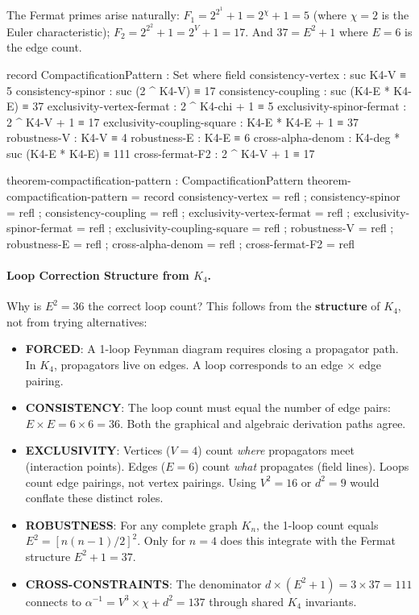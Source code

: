 \documentclass[11pt,a4paper]{book}
\begin{document}
The Fermat primes arise naturally: $F_1 = 2^{2^1} + 1 = 2^\chi + 1 = 5$ (where $\chi = 2$ is the Euler characteristic); $F_2 = 2^{2^2} + 1 = 2^V + 1 = 17$. And $37 = E^2 + 1$ where $E = 6$ is the edge count.

\begin{code}
record CompactificationPattern : Set where
  field
    consistency-vertex : suc K4-V ≡ 5
    consistency-spinor : suc (2 ^ K4-V) ≡ 17
    consistency-coupling : suc (K4-E * K4-E) ≡ 37
    exclusivity-vertex-fermat : 2 ^ K4-chi + 1 ≡ 5
    exclusivity-spinor-fermat : 2 ^ K4-V + 1 ≡ 17
    exclusivity-coupling-square : K4-E * K4-E + 1 ≡ 37
    robustness-V : K4-V ≡ 4
    robustness-E : K4-E ≡ 6
    cross-alpha-denom : K4-deg * suc (K4-E * K4-E) ≡ 111
    cross-fermat-F2 : 2 ^ K4-V + 1 ≡ 17

theorem-compactification-pattern : CompactificationPattern
theorem-compactification-pattern = record
  { consistency-vertex = refl
  ; consistency-spinor = refl
  ; consistency-coupling = refl
  ; exclusivity-vertex-fermat = refl
  ; exclusivity-spinor-fermat = refl
  ; exclusivity-coupling-square = refl
  ; robustness-V = refl
  ; robustness-E = refl
  ; cross-alpha-denom = refl
  ; cross-fermat-F2 = refl
  }

\end{code}

\paragraph{Loop Correction Structure from $K_4$.}
Why is $E^2 = 36$ the correct loop count? This follows from the \textbf{structure}
of $K_4$, not from trying alternatives:

\begin{itemize}
\item \textbf{FORCED}: A 1-loop Feynman diagram requires closing a propagator path. In $K_4$,
  propagators live on edges. A loop corresponds to an edge $\times$ edge pairing.
\item \textbf{CONSISTENCY}: The loop count must equal the number of edge pairs:
  $E \times E = 6 \times 6 = 36$. Both the graphical and algebraic derivation paths agree.
\item \textbf{EXCLUSIVITY}: Vertices ($V=4$) count \emph{where} propagators meet (interaction points).
  Edges ($E=6$) count \emph{what} propagates (field lines). Loops count edge pairings, not
  vertex pairings. Using $V^2=16$ or $d^2=9$ would conflate these distinct roles.
\item \textbf{ROBUSTNESS}: For any complete graph $K_n$, the 1-loop count equals $E^2 = [n(n-1)/2]^2$.
  Only for $n=4$ does this integrate with the Fermat structure $E^2+1=37$.
\item \textbf{CROSS-CONSTRAINTS}: The denominator $d \times (E^2+1) = 3 \times 37 = 111$
  connects to $\alpha^{-1} = V^3 \times \chi + d^2 = 137$ through shared $K_4$ invariants.
\end{itemize}
\end{document}
